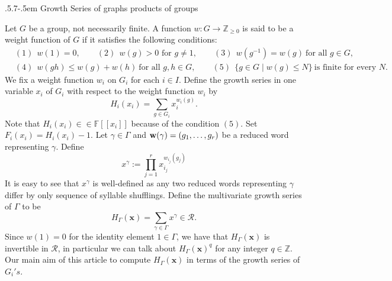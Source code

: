 \documentclass[11pt,reqno]{amsart}
\makeatletter
\numberwithin{equation}{section} %
\theoremstyle{definition}
\theoremstyle{remark}
\numberwithin{equation}{section}
\def\subsection{\def\@secnumfont{\bfseries}\@startsection{subsection}{2}%
  {\parindent}{.5\linespacing\@plus.7\linespacing}{-.5em}%
  {\normalfont\bfseries}}
\makeatother
\begin{document}
\subsection{Growth Series of graphs products of groups}\label{growthdef} 

Let $G$ be a group, not necessarily finite. A function $w: G\to \mathbb Z_{\ge 0}$ is said to be a weight function of $G$ if it satisfies the following conditions:
\begin{align*}
&(1) \ \ w(1)=0,\qquad
(2)\ \ w(g)>0 \text{ for } g\neq 1,\qquad
(3)\ \ w(g^{-1})=w(g)\ \text{for all } g\in G,\\
&(4)\ \ w(gh)\le w(g)+w(h)\ \text{for all } g,h\in G,\qquad
(5)\ \ \{g\in G\mid w(g)\le N\}\ \text{is finite for every } N.
\end{align*}
   \medskip
   \noindent
We fix a weight function $w_i$ on $G_i$ for each $i\in I. $
Define the growth series in one variable $x_i$ of $G_i$ with respect to the weight function $w_i$ by
\begin{equation*}
H_i(x_i) = \sum_{g \in G_i} x_i^{w_i(g)}.
\end{equation*}
Note that $H_i(x_i)\in \in \mathbb F[[x_i]]$ because of the condition $(5)$. Set $F_i(x_i) = H_i(x_i)-1$. 
 Let $\gamma\in \Gamma$ and $\bold w(\gamma)= (g_1, \dots, g_r)$
be a reduced word representing $\gamma$. 
Define
\begin{equation*}
x^\gamma := \prod_{j=1}^r x_{i_j}^{w_{i_j}(g_j)}
\end{equation*}
It is easy to see that $x^\gamma$
is well-defined as any two reduced words representing $\gamma$ differ by only sequence of  syllable shufflings.
Define the multivariate growth series of $\Gamma$ to be
\begin{equation*}
H_{\Gamma}(\mathbf{x}) = \sum_{\gamma \in \Gamma} x^\gamma \in \mathcal{R}.
\end{equation*}
Since $w(1)=0$ for the identity element $1\in \Gamma$, we have that $H_{\Gamma}(\mathbf{x})$ is invertible in $\mathcal{R}$, in particular we can talk about $H_{\Gamma}(\mathbf{x})^q$ for any integer $q\in \mathbb Z.$
Our main aim of this article to compute $H_{\Gamma}(\mathbf{x})$ in terms of the growth series of $G_i's.$
\end{document}
